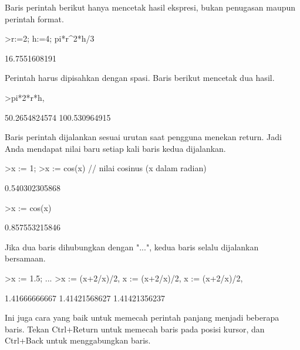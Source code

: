 \documentclass[a4paper,10pt]{article}
\begin{document}
\begin{eulernotebook}
\begin{eulercomment}
Baris perintah berikut hanya mencetak hasil ekspresi, bukan penugasan
maupun perintah format.
\end{eulercomment}
\begin{eulerprompt}
>r:=2; h:=4; pi*r^2*h/3
\end{eulerprompt}
\begin{euleroutput}
  16.7551608191
\end{euleroutput}
\begin{eulercomment}
Perintah harus dipisahkan dengan spasi. Baris berikut mencetak dua hasil.
\end{eulercomment}
\begin{eulerprompt}
>pi*2*r*h, %
\end{eulerprompt}
\begin{euleroutput}
  50.2654824574
  100.530964915
\end{euleroutput}
\begin{eulercomment}
Baris perintah dijalankan sesuai urutan saat pengguna menekan return.
Jadi Anda mendapat nilai baru setiap kali baris kedua dijalankan.
\end{eulercomment}
\begin{eulerprompt}
>x := 1;
>x := cos(x) // nilai cosinus (x dalam radian)
\end{eulerprompt}
\begin{euleroutput}
  0.540302305868
\end{euleroutput}
\begin{eulerprompt}
>x := cos(x)
\end{eulerprompt}
\begin{euleroutput}
  0.857553215846
\end{euleroutput}
\begin{eulercomment}
Jika dua baris dihubungkan dengan "...", kedua baris selalu dijalankan
bersamaan.
\end{eulercomment}
\begin{eulerprompt}
>x := 1.5; ...
>x := (x+2/x)/2, x := (x+2/x)/2, x := (x+2/x)/2,
\end{eulerprompt}
\begin{euleroutput}
  1.41666666667
  1.41421568627
  1.41421356237
\end{euleroutput}
\begin{eulercomment}
Ini juga cara yang baik untuk memecah perintah panjang menjadi beberapa
baris. Tekan Ctrl+Return untuk memecah baris pada posisi kursor, dan
Ctrl+Back untuk menggabungkan baris.


\end{eulercomment}
\end{eulernotebook}
\end{document}
